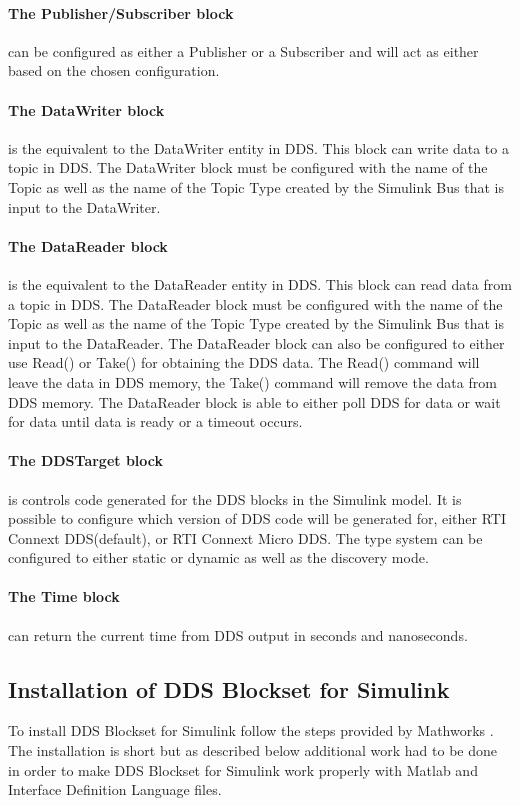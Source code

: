 \paragraph{The Publisher/Subscriber block} can be configured as either a Publisher or a Subscriber and will act as either based on the chosen configuration.

\paragraph{The DataWriter block} is the equivalent to the DataWriter entity in DDS. This block can write data to a topic in DDS. The DataWriter block must be configured with the name of the Topic as well as the name of the Topic Type created by the Simulink Bus that is input to the DataWriter.

\paragraph{The DataReader block} is the equivalent to the DataReader entity in DDS. This block can read data from a topic in DDS. The DataReader block must be configured with the name of the Topic as well as the name of the Topic Type created by the Simulink Bus that is input to the DataReader. The DataReader block can also be configured to either use Read() or Take() for obtaining the DDS data. The Read() command will leave the data in DDS memory, the Take() command will remove the data from DDS memory. The DataReader block is able to either poll DDS for data or wait for data until data is ready or a timeout occurs.

\paragraph{The DDSTarget block} is controls code generated for the DDS blocks in the Simulink model. It is possible to configure which version of DDS code will be generated for, either RTI Connext DDS(default), or RTI Connext Micro DDS. The type system can be configured to either static or dynamic as well as the discovery mode.

\paragraph{The Time block} can return the current time from DDS output in seconds and nanoseconds.

\subsection{Installation of DDS Blockset for Simulink}
To install DDS Blockset for Simulink follow the steps provided by Mathworks \cite{DDSBlocksetPilotSupportPackageUserGuide}. The installation is short but as described below additional work had to be done in order to make DDS Blockset for Simulink work properly with Matlab and Interface Definition Language files.

